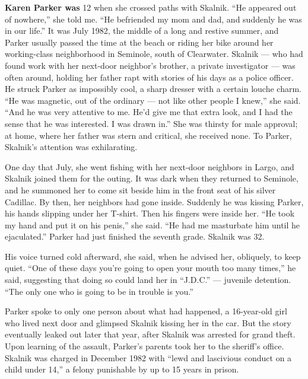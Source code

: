 \textbf{Karen Parker was} 12 when she crossed paths with Skalnik. ``He
appeared out of nowhere,'' she told me. ``He befriended my mom and dad,
and suddenly he was in our life.'' It was July 1982, the middle of a
long and restive summer, and Parker usually passed the time at the beach
or riding her bike around her working-class neighborhood in Seminole,
south of Clearwater. Skalnik --- who had found work with her next-door
neighbor's brother, a private investigator --- was often around, holding
her father rapt with stories of his days as a police officer. He struck
Parker as impossibly cool, a sharp dresser with a certain louche charm.
``He was magnetic, out of the ordinary --- not like other people I
knew,'' she said. ``And he was very attentive to me. He'd give me that
extra look, and I had the sense that he was interested. I was drawn
in.'' She was thirsty for male approval; at home, where her father was
stern and critical, she received none. To Parker, Skalnik's attention
was exhilarating.

One day that July, she went fishing with her next-door neighbors in
Largo, and Skalnik joined them for the outing. It was dark when they
returned to Seminole, and he summoned her to come sit beside him in the
front seat of his silver Cadillac. By then, her neighbors had gone
inside. Suddenly he was kissing Parker, his hands slipping under her
T-shirt. Then his fingers were inside her. ``He took my hand and put it
on his penis,'' she said. ``He had me masturbate him until he
ejaculated.'' Parker had just finished the seventh grade. Skalnik was
32.

His voice turned cold afterward, she said, when he advised her,
obliquely, to keep quiet. ``One of these days you're going to open your
mouth too many times,'' he said, suggesting that doing so could land her
in ``J.D.C.'' --- juvenile detention. ``The only one who is going to be
in trouble is you.''

Parker spoke to only one person about what had happened, a 16-year-old
girl who lived next door and glimpsed Skalnik kissing her in the car.
But the story eventually leaked out later that year, after Skalnik was
arrested for grand theft. Upon learning of the assault, Parker's parents
took her to the sheriff's office. Skalnik was charged in December 1982
with ``lewd and lascivious conduct on a child under 14,'' a felony
punishable by up to 15 years in prison.

